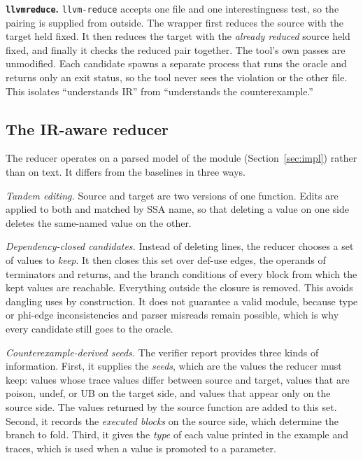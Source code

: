 \documentclass[conference]{IEEEtran}
\newcommand{\cn}[1]{\texttt{#1}}   %
\begin{document}
\textbf{\cn{llvmreduce}.} \texttt{llvm-reduce} accepts one file and one interestingness test, so the pairing is supplied from outside. The wrapper first reduces the source with the target held fixed. It then reduces the target with the \emph{already reduced} source held fixed, and finally it checks the reduced pair together. The tool's own passes are unmodified. Each candidate spawns a separate process that runs the oracle and returns only an exit status, so the tool never sees the violation or the other file. This isolates ``understands IR'' from ``understands the counterexample.''

\subsection{The IR-aware reducer}

The reducer operates on a parsed model of the module (Section~\ref{sec:impl}) rather than on text. It differs from the baselines in three ways.

\emph{Tandem editing.} Source and target are two versions of one function. Edits are applied to both and matched by SSA name, so that deleting a value on one side deletes the same-named value on the other.

\emph{Dependency-closed candidates.} Instead of deleting lines, the reducer chooses a set of values to \emph{keep}. It then closes this set over def-use edges, the operands of terminators and returns, and the branch conditions of every block from which the kept values are reachable. Everything outside the closure is removed. This avoids dangling uses by construction. It does not guarantee a valid module, because type or phi-edge inconsistencies and parser misreads remain possible, which is why every candidate still goes to the oracle.

\emph{Counterexample-derived seeds.} The verifier report provides three kinds of information. First, it supplies the \emph{seeds}, which are the values the reducer must keep: values whose trace values differ between source and target, values that are poison, undef, or UB on the target side, and values that appear only on the source side. The values returned by the source function are added to this set. Second, it records the \emph{executed blocks} on the source side, which determine the branch to fold. Third, it gives the \emph{type} of each value printed in the example and traces, which is used when a value is promoted to a parameter.
\end{document}
